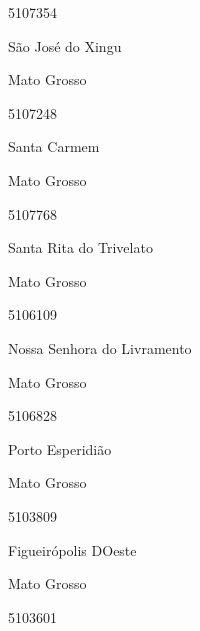 \documentclass[
  letterpaper,
]{report}
\begin{document}
\n      

5107354

\n      

São José do Xingu

\n    

\n    

\n      

Mato Grosso

\n      

5107248

\n      

Santa Carmem

\n    

\n    

\n      

Mato Grosso

\n      

5107768

\n      

Santa Rita do Trivelato

\n    

\n    

\n      

Mato Grosso

\n      

5106109

\n      

Nossa Senhora do Livramento

\n    

\n    

\n      

Mato Grosso

\n      

5106828

\n      

Porto Esperidião

\n    

\n    

\n      

Mato Grosso

\n      

5103809

\n      

Figueirópolis D\textquotesingle Oeste

\n    

\n    

\n      

Mato Grosso

\n      

5103601

\n      
\end{document}
